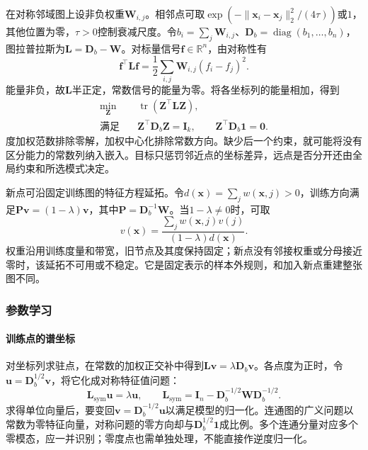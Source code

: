 在对称邻域图上设非负权重$\bm{W}_{i,j}$。相邻点可取$\exp(-\lVert\bm{x}_i-\bm{x}_j\rVert_2^2/(4\tau))$或$1$，其他位置为零，$\tau>0$控制衰减尺度。令$b_i=\sum_j\bm{W}_{i,j}$、$\bm{D}_b=\operatorname{diag}(b_1,\ldots,b_n)$，图拉普拉斯为$\bm{L}=\bm{D}_b-\bm{W}$。对标量信号$\bm{f}\in\mathbb{R}^n$，由对称性有
\begin{equation}
  \label{eq:dim-le-energy}
  \bm{f}^{\top}\bm{L}\bm{f}
  =\frac12\sum_{i,j}\bm{W}_{i,j}(f_i-f_j)^2.
\end{equation}
能量非负，故$\bm{L}$半正定，常数信号的能量为零。将各坐标列的能量相加，得到
\begin{equation}
  \label{eq:dim-le-objective}
  \begin{aligned}
    \min_{\bm{Z}}\quad&
      \operatorname{tr}(\bm{Z}^{\top}\bm{L}\bm{Z}),\\
    \text{满足}\quad&
      \bm{Z}^{\top}\bm{D}_b\bm{Z}=\bm{I}_k,\qquad
      \bm{Z}^{\top}\bm{D}_b\bm{1}=\bm{0}.
  \end{aligned}
\end{equation}
度加权范数排除零解，加权中心化排除常数方向。缺少后一个约束，就可能将没有区分能力的常数列纳入嵌入。目标只惩罚邻近点的坐标差异，远点是否分开还由全局约束和所选模式决定。

新点可沿固定训练图的特征方程延拓。令$d(\bm x)=\sum_jw(\bm x,j)>0$，训练方向满足$\bm P\bm v=(1-\lambda)\bm v$，其中$\bm P=\bm D_b^{-1}\bm W$。当$1-\lambda\ne0$时，可取
\[
 v(\bm x)=\frac{\sum_jw(\bm x,j)v(j)}{(1-\lambda)d(\bm x)}.
\]
权重沿用训练度量和带宽，旧节点及其度保持固定；新点没有邻接权重或分母接近零时，该延拓不可用或不稳定。它是固定表示的样本外规则，和加入新点重建整张图不同。

\subsubsection{参数学习}

\paragraph{训练点的谱坐标}

对坐标列求驻点，在常数的加权正交补中得到$\bm{L}\bm{v}=\lambda\bm{D}_b\bm{v}$。各点度为正时，令$\bm{u}=\bm{D}_b^{1/2}\bm{v}$，将它化成对称特征值问题：
\[
  \bm{L}_{\mathrm{sym}}\bm{u}=\lambda\bm{u},
  \qquad
  \bm{L}_{\mathrm{sym}}
  =\bm{I}_n-\bm{D}_b^{-1/2}\bm{W}\bm{D}_b^{-1/2}.
\]
求得单位向量后，要变回$\bm{v}=\bm{D}_b^{-1/2}\bm{u}$以满足模型的归一化。连通图的广义问题以常数为零特征向量，对称问题的零方向却与$\bm{D}_b^{1/2}\bm{1}$成比例。多个连通分量对应多个零模态，应一并识别；零度点也需单独处理，不能直接作逆度归一化。

